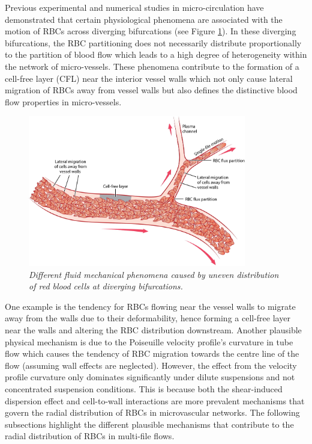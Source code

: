 \noindent Previous experimental and numerical studies in micro-circulation have demonstrated that certain physiological phenomena are associated with the motion of RBCs across diverging bifurcations (see Figure \ref{FluidMechanicalPhenomena}). In these diverging bifurcations, the RBC partitioning does not necessarily distribute proportionally to the partition of blood flow which leads to a high degree of heterogeneity within the network of micro-vessels. These phenomena contribute to the formation of a cell-free layer (CFL) near the interior vessel walls which not only cause lateral migration of RBCs away from vessel walls but also defines the distinctive blood flow properties in micro-vessels.\cite{AnnualReview} 

\begin{figure}[H]
\centering
\includegraphics[width=0.85\textwidth]{images/PlasmaSkimming.jpeg}
\caption{\textit{Different fluid mechanical phenomena caused by uneven distribution of red blood cells at diverging bifurcations.\cite{AnnualReview}} \label{FluidMechanicalPhenomena}}
\end{figure}


\noindent One example is the tendency for RBCs flowing near the vessel walls to migrate away from the walls due to their deformability, hence forming a cell-free layer near the walls and altering the RBC distribution downstream.\cite{PhysRevLett} Another plausible physical mechanism is due to the Poiseuille velocity profile's curvature in tube flow which causes the tendency of RBC migration towards the centre line of the flow (assuming wall effects are neglected).\cite{2020Charles} However, the effect from the velocity profile curvature only dominates significantly under dilute suspensions and not concentrated suspension conditions. This is because both the shear-induced dispersion effect and cell-to-wall interactions are more prevalent mechanisms that govern the radial distribution of RBCs in microvascular networks.\cite{CoupierG2008Nlmo} The following subsections highlight the different plausible mechanisms that contribute to the radial distribution of RBCs in multi-file flows.


